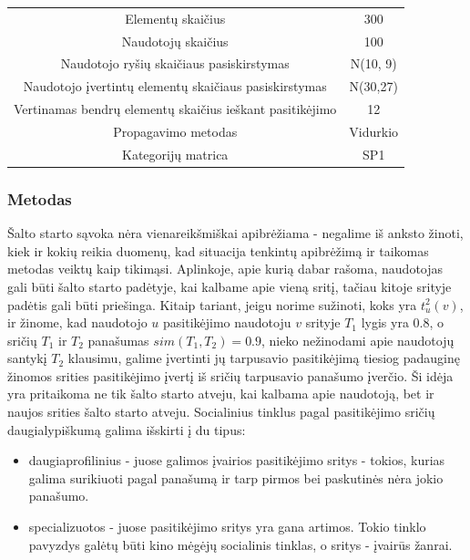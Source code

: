 \documentclass{VUMIFInfMagistrinis}
\begin{document}
\begin{center}
	\begin{tabular}{||c c||} 
		
		
		Elementų skaičius & 300 \\
		Naudotojų skaičius & 100 \\
		Naudotojo ryšių skaičiaus pasiskirstymas &  N(10, 9) \\
		Naudotojo įvertintų elementų skaičiaus pasiskirstymas & N(30,27) \\
		Vertinamas bendrų elementų skaičius ieškant pasitikėjimo & 12 \\
		Propagavimo metodas & Vidurkio\\
		Kategorijų matrica & SP1 \\
	\end{tabular}
	
\end{center}
\subsubsection{Metodas}
\indent
Šalto starto sąvoka nėra vienareikšmiškai apibrėžiama - negalime iš anksto žinoti, kiek ir kokių reikia duomenų, kad situacija tenkintų apibrėžimą ir taikomas metodas veiktų kaip tikimąsi. Aplinkoje, apie kurią dabar rašoma, naudotojas gali būti šalto starto padėtyje, kai kalbame apie vieną sritį, tačiau kitoje srityje padėtis gali būti priešinga. Kitaip tariant, jeigu norime sužinoti, koks yra $t_u^2(v)$, ir žinome, kad naudotojo $u$ pasitikėjimo naudotoju $v$ srityje $T_1$ lygis yra $0.8$, o sričių $T_1$ ir $T_2$ panašumas $sim(T_1, T_2) = 0.9$, nieko nežinodami apie naudotojų santykį $T_2$ klausimu, galime įvertinti jų tarpusavio pasitikėjimą tiesiog padauginę žinomos srities pasitikėjimo įvertį iš sričių tarpusavio panašumo įverčio.
\newline
\indent
Ši idėja yra pritaikoma ne tik šalto starto atveju, kai kalbama apie naudotoją, bet ir naujos srities šalto starto atveju. Socialinius tinklus pagal pasitikėjimo sričių daugialypiškumą galima išskirti į du tipus:
\begin{itemize}
	\item daugiaprofilinius - juose galimos įvairios pasitikėjimo sritys - tokios, kurias galima surikiuoti pagal panašumą ir tarp pirmos bei paskutinės nėra jokio panašumo.
	\item specializuotos - juose pasitikėjimo sritys yra gana artimos. Tokio tinklo pavyzdys galėtų būti kino mėgėjų socialinis tinklas, o sritys - įvairūs žanrai.
\end{itemize}
\end{document}
